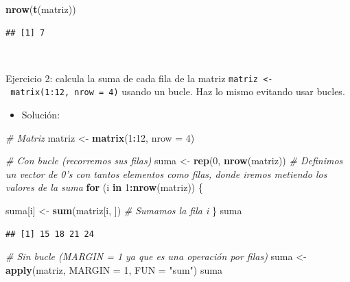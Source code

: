 \documentclass[11pt,]{book}
\newenvironment{Shaded}{\begin{snugshade}}{\end{snugshade}}
\newcommand{\CommentTok}[1]{\textcolor[rgb]{0.37,0.37,0.37}{\textit{#1}}}
\newcommand{\ControlFlowTok}[1]{\textcolor[rgb]{0.27,0.27,0.27}{\textbf{#1}}}
\newcommand{\DataTypeTok}[1]{\textcolor[rgb]{0.27,0.27,0.27}{#1}}
\newcommand{\DecValTok}[1]{\textcolor[rgb]{0.06,0.06,0.06}{#1}}
\newcommand{\KeywordTok}[1]{\textcolor[rgb]{0.27,0.27,0.27}{\textbf{#1}}}
\newcommand{\NormalTok}[1]{#1}
\newcommand{\OperatorTok}[1]{\textcolor[rgb]{0.43,0.43,0.43}{\textbf{#1}}}
\newcommand{\StringTok}[1]{\textcolor[rgb]{0.5,0.5,0.5}{#1}}
\providecommand{\tightlist}{%
  \setlength{\itemsep}{0pt}\setlength{\parskip}{0pt}}
\begin{document}
\begin{Shaded}
\begin{Highlighting}[]
\KeywordTok{nrow}\NormalTok{(}\KeywordTok{t}\NormalTok{(matriz))}
\end{Highlighting}
\end{Shaded}

\begin{verbatim}
## [1] 7
\end{verbatim}

~

Ejercicio 2: calcula la suma de cada fila de la matriz \texttt{matriz\ \textless{}-\ matrix(1:12,\ nrow\ =\ 4)} usando un bucle. Haz lo mismo evitando usar bucles.

\begin{itemize}
\tightlist
\item
  Solución:
\end{itemize}

\begin{Shaded}
\begin{Highlighting}[]
\CommentTok{# Matriz}
\NormalTok{matriz <-}\StringTok{ }\KeywordTok{matrix}\NormalTok{(}\DecValTok{1}\OperatorTok{:}\DecValTok{12}\NormalTok{, }\DataTypeTok{nrow =} \DecValTok{4}\NormalTok{)}

\CommentTok{# Con bucle (recorremos sus filas)}
\NormalTok{suma <-}\StringTok{ }\KeywordTok{rep}\NormalTok{(}\DecValTok{0}\NormalTok{, }\KeywordTok{nrow}\NormalTok{(matriz)) }\CommentTok{# Definimos un vector de 0's con tantos elementos como filas, donde iremos metiendo los valores de la suma}
\ControlFlowTok{for}\NormalTok{ (i }\ControlFlowTok{in} \DecValTok{1}\OperatorTok{:}\KeywordTok{nrow}\NormalTok{(matriz)) \{}
  
\NormalTok{  suma[i] <-}\StringTok{ }\KeywordTok{sum}\NormalTok{(matriz[i, ]) }\CommentTok{# Sumamos la fila i}
\NormalTok{\}}
\NormalTok{suma}
\end{Highlighting}
\end{Shaded}

\begin{verbatim}
## [1] 15 18 21 24
\end{verbatim}

\begin{Shaded}
\begin{Highlighting}[]
\CommentTok{# Sin bucle (MARGIN = 1 ya que es una operación por filas)}
\NormalTok{suma <-}\StringTok{ }\KeywordTok{apply}\NormalTok{(matriz, }\DataTypeTok{MARGIN =} \DecValTok{1}\NormalTok{, }\DataTypeTok{FUN =} \StringTok{"sum"}\NormalTok{)}
\NormalTok{suma}
\end{Highlighting}
\end{Shaded}
\end{document}
